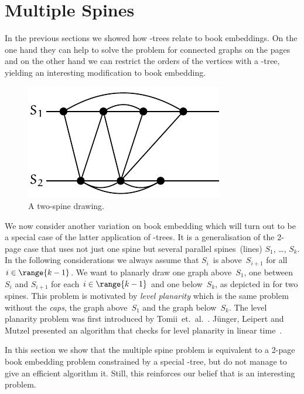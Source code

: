 \section{Multiple Spines}\label{section:multi_spine}

In the previous sections we showed how \PQ-trees relate
to book embeddings. On the one hand they can help to solve
the problem for connected graphs on the pages and on the other hand
we can restrict the orders of the vertices with a \PQ-tree, yielding
an interesting modification to book embedding.

\begin{figure}[\placement]\centering
    \includegraphics{figures/t_two_spines}
    \caption[Two-spine drawing]{A two-spine drawing.}
    \label{figure:two_spines}
\end{figure}

We now consider another variation on book embedding which 
will turn out to be a special case of the latter application of \PQ-trees.
It is a generalisation of the 2-page case that uses not just one spine but several parallel
spines~(lines) $S_1$, \dots, $S_k$. In the following considerations we always assume
that $S_i$~is above~$S_{i+1}$ for all $i\in\range{k-1}$.
We want to planarly draw one graph above~$S_1$,
one between~$S_i$ and $S_{i+1}$ for each $i \in \range{k-1}$ and one
below~$S_k$, as depicted in  for
two spines. This problem is motivated by \emph{level planarity} which
is the same problem without the \emph{caps}, the graph above~$S_1$ and
the graph below~$S_k$.
The level planarity problem was first introduced by Tomii~et.~al.~\cite{Tomii77}. 
Jünger, Leipert and
Mutzel presented an algorithm that checks for level planarity in linear time~\cite{Junger99}.

In this section we show that the multiple spine problem is equivalent to a 2-page book embedding problem constrained by a special \PT-tree, but do not manage to give an efficient algorithm
it. Still, this reinforces our belief that \probPTree is an interesting problem.

